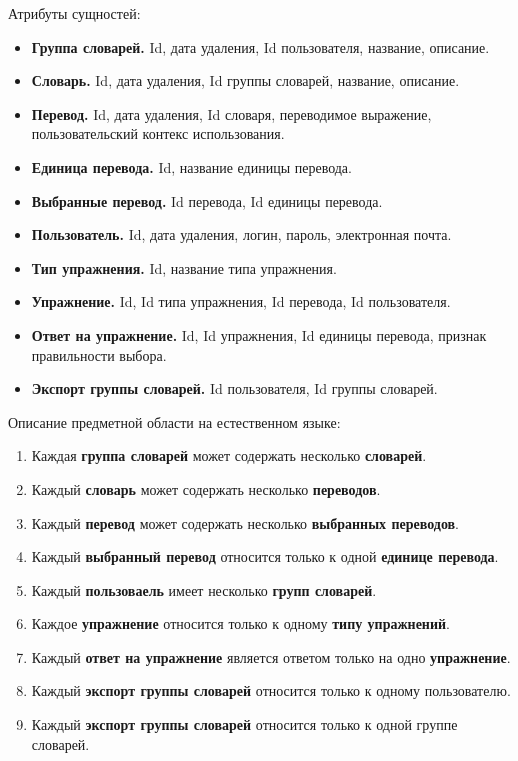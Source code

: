 \documentclass[a4paper,14pt]{extarticle}
\begin{document}
Атрибуты сущностей:

\begin{itemize}
    \item \textbf{Группа словарей.} Id, дата удаления, Id пользователя, название, описание.
    \item \textbf{Словарь.} Id, дата удаления, Id группы словарей, название, описание.
    \item \textbf{Перевод.} Id, дата удаления, Id словаря, переводимое выражение, пользовательский контекс использования.
    \item \textbf{Единица перевода.} Id, название единицы перевода.
    \item \textbf{Выбранные перевод.} Id перевода, Id единицы перевода.
    \item \textbf{Пользователь.} Id, дата удаления, логин, пароль, электронная почта.
    \item \textbf{Тип упражнения.} Id, название типа упражнения.
    \item \textbf{Упражнение.} Id, Id типа упражнения, Id перевода, Id пользователя.
    \item \textbf{Ответ на упражнение.} Id, Id упражнения, Id единицы перевода, признак правильности выбора.
    \item \textbf{Экспорт группы словарей.} Id пользователя, Id группы словарей.
\end{itemize}

Описание предметной области на естественном языке:

\begin{enumerate}
    \item Каждая \textbf{группа словарей} может содержать несколько \textbf{словарей}.
    \item Каждый \textbf{словарь} может содержать несколько \textbf{переводов}.
    \item Каждый \textbf{перевод} может содержать несколько \textbf{выбранных переводов}.
    \item Каждый \textbf{выбранный перевод} относится только к одной \textbf{единице перевода}.
    \item Каждый \textbf{пользоваель} имеет несколько \textbf{групп словарей}.
    \item Каждое \textbf{упражнение} относится только к одному \textbf{типу упражнений}.
    \item Каждый \textbf{ответ на упражнение} является ответом только на одно \textbf{упражнение}.
    \item Каждый \textbf{экспорт группы словарей} относится только к одному пользователю.
    \item Каждый \textbf{экспорт группы словарей} относится только к одной группе словарей.
\end{enumerate}
\end{document}
